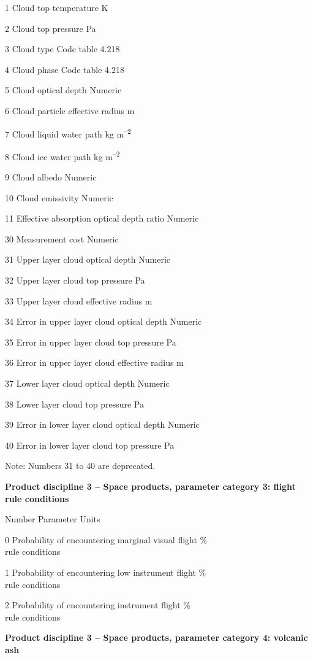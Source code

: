 1 Cloud top temperature K

2 Cloud top pressure Pa

3 Cloud type Code table 4.218

4 Cloud phase Code table 4.218

5 Cloud optical depth Numeric

6 Cloud particle effective radius m

7 Cloud liquid water path kg m\textsuperscript{--2}

8 Cloud ice water path kg m\textsuperscript{--2}

9 Cloud albedo Numeric

10 Cloud emissivity Numeric

11 Effective absorption optical depth ratio Numeric

30 Measurement cost Numeric

31 Upper layer cloud optical depth Numeric

32 Upper layer cloud top pressure Pa

33 Upper layer cloud effective radius m

34 Error in upper layer cloud optical depth Numeric

35 Error in upper layer cloud top pressure Pa

36 Error in upper layer cloud effective radius m

37 Lower layer cloud optical depth Numeric

38 Lower layer cloud top pressure Pa

39 Error in lower layer cloud optical depth Numeric

40 Error in lower layer cloud top pressure Pa

Note: Numbers 31 to 40 are deprecated.

\textbf{Product discipline 3 -- Space products, parameter category 3: flight rule conditions}

Number Parameter Units

0 Probability of encountering marginal visual flight \%\\
rule conditions

1 Probability of encountering low instrument flight \%\\
rule conditions

2 Probability of encountering instrument flight \%\\
rule conditions

\textbf{Product discipline 3 -- Space products, parameter category 4: volcanic ash}

